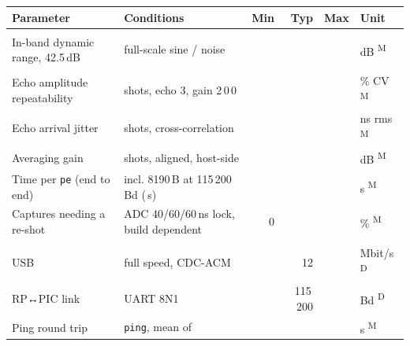 \documentclass[10pt,a4paper]{article}
\makeatletter
\newcommand{\cmd}[1]{\texttt{#1}}
\newcommand{\meas}{\textsuperscript{M}}
\newcommand{\des}{\textsuperscript{D}}
\newenvironment{spec}[1]{%
  \small\begin{longtable}{@{}>{\raggedright\arraybackslash}p{50mm}>{\raggedright\arraybackslash}p{55mm}rrrl@{}}
  \toprule\textbf{Parameter} & \textbf{Conditions} & \textbf{Min} & \textbf{Typ} & \textbf{Max} & \textbf{Unit}\\\midrule\endhead
  \multicolumn{6}{@{}l}{\color{accent}\bfseries #1}\\}{\bottomrule\end{longtable}}
\newcommand{\grp}[1]{\multicolumn{6}{@{}l}{\color{accent}\bfseries #1}\\}
\makeatother
\begin{document}
\begin{spec}{Transmit (pulser)}
In-band dynamic range, 42.5\,dB & full-scale sine / noise & & \vdrmax & & dB \meas\\
\grp{Repeatability and throughput}
Echo amplitude repeatability & 16 shots, echo 3, gain 2\,0\,0 & & \vampcv & & \% CV \meas\\
Echo arrival jitter & 16 shots, cross-correlation & & \vjitter & & ns rms \meas\\
Averaging gain & 8 shots, aligned, host-side & & \vavggain & & dB \meas\\
Time per \cmd{pe} (end to end) & incl. 8190\,B at 115\,200\,Bd (\vxfer\,s) & & \vpetime & & s \meas\\
Captures needing a re-shot & ADC 40/60/60\,ns lock, build dependent & 0 & & \vretryrate & \% \meas\\
\grp{Link and control}
USB & full speed, CDC-ACM & & 12 & & Mbit/s \des\\
RP↔PIC link & UART 8N1 & & 115\,200 & & Bd \des\\
Ping round trip & \cmd{ping}, mean of \vpingn & & \vpingus & & \textmu s \meas\\
\end{spec}

\clearpage
\end{document}
